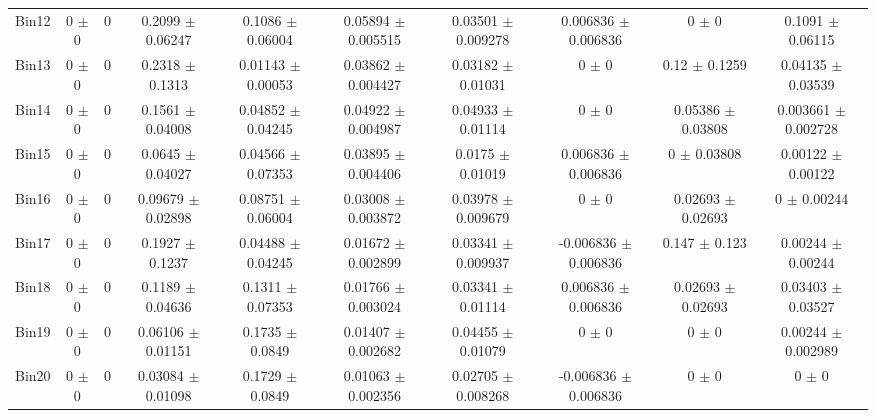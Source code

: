 \begin{tabular}{@{\extracolsep{4pt}}lccccccccc@{}}
     Bin12 & 0 $\pm$ 0 & 0 & 0.2099 $\pm$ 0.06247 & 0.1086 $\pm$ 0.06004 & 0.05894 $\pm$ 0.005515 & 0.03501 $\pm$ 0.009278 & 0.006836 $\pm$ 0.006836 & 0 $\pm$ 0 & 0.1091 $\pm$ 0.06115 \\ 
     Bin13 & 0 $\pm$ 0 & 0 & 0.2318 $\pm$ 0.1313 & 0.01143 $\pm$ 0.00053 & 0.03862 $\pm$ 0.004427 & 0.03182 $\pm$ 0.01031 & 0 $\pm$ 0 & 0.12 $\pm$ 0.1259 & 0.04135 $\pm$ 0.03539 \\ 
     Bin14 & 0 $\pm$ 0 & 0 & 0.1561 $\pm$ 0.04008 & 0.04852 $\pm$ 0.04245 & 0.04922 $\pm$ 0.004987 & 0.04933 $\pm$ 0.01114 & 0 $\pm$ 0 & 0.05386 $\pm$ 0.03808 & 0.003661 $\pm$ 0.002728 \\ 
     Bin15 & 0 $\pm$ 0 & 0 & 0.0645 $\pm$ 0.04027 & 0.04566 $\pm$ 0.07353 & 0.03895 $\pm$ 0.004406 & 0.0175 $\pm$ 0.01019 & 0.006836 $\pm$ 0.006836 & 0 $\pm$ 0.03808 & 0.00122 $\pm$ 0.00122 \\ 
     Bin16 & 0 $\pm$ 0 & 0 & 0.09679 $\pm$ 0.02898 & 0.08751 $\pm$ 0.06004 & 0.03008 $\pm$ 0.003872 & 0.03978 $\pm$ 0.009679 & 0 $\pm$ 0 & 0.02693 $\pm$ 0.02693 & 0 $\pm$ 0.00244 \\ 
     Bin17 & 0 $\pm$ 0 & 0 & 0.1927 $\pm$ 0.1237 & 0.04488 $\pm$ 0.04245 & 0.01672 $\pm$ 0.002899 & 0.03341 $\pm$ 0.009937 & -0.006836 $\pm$ 0.006836 & 0.147 $\pm$ 0.123 & 0.00244 $\pm$ 0.00244 \\ 
     Bin18 & 0 $\pm$ 0 & 0 & 0.1189 $\pm$ 0.04636 & 0.1311 $\pm$ 0.07353 & 0.01766 $\pm$ 0.003024 & 0.03341 $\pm$ 0.01114 & 0.006836 $\pm$ 0.006836 & 0.02693 $\pm$ 0.02693 & 0.03403 $\pm$ 0.03527 \\ 
     Bin19 & 0 $\pm$ 0 & 0 & 0.06106 $\pm$ 0.01151 & 0.1735 $\pm$ 0.0849 & 0.01407 $\pm$ 0.002682 & 0.04455 $\pm$ 0.01079 & 0 $\pm$ 0 & 0 $\pm$ 0 & 0.00244 $\pm$ 0.002989 \\ 
     Bin20 & 0 $\pm$ 0 & 0 & 0.03084 $\pm$ 0.01098 & 0.1729 $\pm$ 0.0849 & 0.01063 $\pm$ 0.002356 & 0.02705 $\pm$ 0.008268 & -0.006836 $\pm$ 0.006836 & 0 $\pm$ 0 & 0 $\pm$ 0 \\ 
\hline\hline
  \end{tabular}
